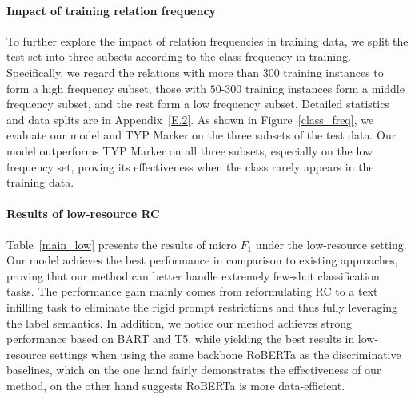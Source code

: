 \documentclass[11pt]{article}
\begin{document}
\paragraph{Impact of training relation frequency}


\begin{comment}
\begin{table*}[t!]
	\centering
\scalebox{0.9}{
		\begin{tabular}{lccccc}  
			\hline
			Dataset & Model & $K$=8 & $K$=16&$K$=32&Full\\\hline
			\multirow{2}*{TACRED} & BART &29.7 (0.74) & 33.5 (0.68)&35.0 (0.66)&74.0 \\ 
			&T5&28.2 (1.31)&32.1 (1.40)&35.0 (0.85)& 74.1\\\hline
			\multirow{2}*{TACREV} & BART & 29.6 (0.59)&32.9 (0.74) &34.3 (0.43)&82.0\\ 
			&T5&27.9 (1.84)&31.7 (1.45)&34.6 (0.93)&82.9\\\hline
			\multirow{2}*{Re-TACRED} & BART &50.6 (2.70) &56.7 (0.79) &62.1 (1.82)&90.3\\ 
			&T5&52.4 (1.64)&57.3 (1.89)&62.3 (1.49)&\\\hline
		\end{tabular}
	}
	\caption{Results of micro $F_1$ (\%) on different PLMs (BART and T5). We report mean
		(and standard deviation) performance over 5 different splits.}
	\label{t5}
\end{table*}
\end{comment}
To further explore the impact of relation frequencies in training data, we split the test set into three subsets according to the class frequency in training. Specifically, we regard the relations with more than $300$ training instances to form a  high frequency subset, those with $50$-$300$ training instances form a middle frequency subset, and the rest form a low frequency subset. Detailed statistics and data splits are in Appendix~\ref{E.2}. As shown in Figure~\ref{class_freq}, we evaluate our model and TYP Marker on the three subsets of the test data. Our model outperforms TYP Marker on all three subsets, especially on the low frequency set, proving its effectiveness when the class rarely appears in the training data.

\paragraph{Results of low-resource RC}
Table~\ref{main_low} presents the results of micro $F_1$ under the low-resource setting. Our model achieves the best performance in comparison to existing approaches, proving that our method can better handle extremely few-shot classification tasks. The performance gain mainly comes from reformulating RC to a text infilling task to eliminate the rigid prompt restrictions and thus fully leveraging the label semantics. In addition, we notice our method achieves strong performance based on BART and T5, while yielding the best results in low-resource settings when using the same backbone RoBERTa as the discriminative baselines, which on the one hand fairly demonstrates the effectiveness of our method, on the other hand suggests RoBERTa is more data-efficient.
\end{document}

